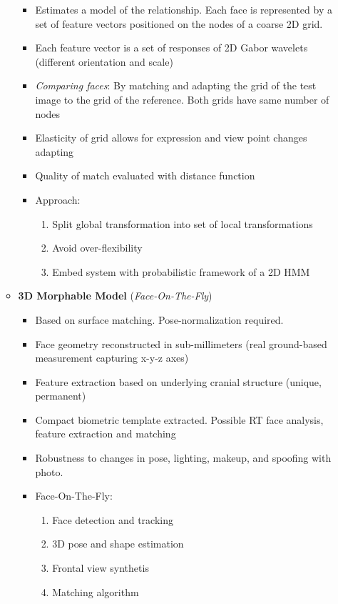 \documentclass[a4paper]{article}
\begin{document}
\begin{itemize}
\begin{itemize}
            \begin{itemize}
              \item Estimates a model of the relationship. Each face is represented by a set of feature vectors positioned on the nodes of a coarse  2D grid.
              \item Each feature vector is a set of responses of 2D Gabor wavelets (different orientation and scale)
              \item \emph{Comparing faces}: By matching and adapting the grid of the test image to the grid of the reference. Both grids have same number of nodes
              \item Elasticity of grid allows for expression and view point changes adapting
              \item Quality of match evaluated with distance function
              \item Approach:
              \begin{enumerate}
                \item Split global transformation into set of local transformations
                \item Avoid over-flexibility
                \item Embed system with probabilistic framework of a 2D HMM
              \end{enumerate}
            \end{itemize}
            \item \textbf{3D Morphable Model} (\emph{Face-On-The-Fly})
            \begin{itemize}
              \item Based on surface matching. Pose-normalization required.
              \item Face geometry reconstructed in sub-millimeters (real ground-based measurement capturing x-y-z axes)
              \item Feature extraction based on underlying cranial structure (unique, permanent)
              \item Compact biometric template extracted. Possible RT face analysis, feature extraction and matching
              \item Robustness to changes in pose, lighting, makeup, and spoofing with photo.
              \item Face-On-The-Fly:
              \begin{enumerate}
                \item Face detection and tracking
                \item 3D pose and shape estimation
                \item Frontal view synthetis
                \item Matching algorithm
              \end{enumerate}
            \end{itemize}
          \end{itemize}
      \end{itemize}
\end{document}
